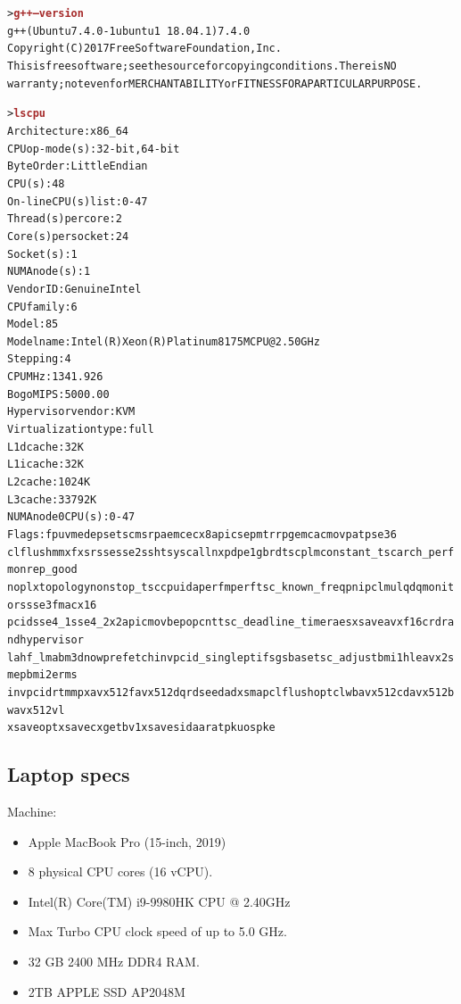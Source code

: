 \documentclass[10pt]{article}
\begin{document}
\begin{alltt}
\footnotesize
> \textbf{\textcolor{brown}{g++ --version}}
g++ (Ubuntu 7.4.0-1ubuntu1~18.04.1) 7.4.0
Copyright (C) 2017 Free Software Foundation, Inc.
This is free software; see the source for copying conditions.  There is NO
warranty; not even for MERCHANTABILITY or FITNESS FOR A PARTICULAR PURPOSE.


> \textbf{\textcolor{brown}{lscpu}}
Architecture:        x86_64
CPU op-mode(s):      32-bit, 64-bit
Byte Order:          Little Endian
CPU(s):              48
On-line CPU(s) list: 0-47
Thread(s) per core:  2
Core(s) per socket:  24
Socket(s):           1
NUMA node(s):        1
Vendor ID:           GenuineIntel
CPU family:          6
Model:               85
Model name:          Intel(R) Xeon(R) Platinum 8175M CPU @ 2.50GHz
Stepping:            4
CPU MHz:             1341.926
BogoMIPS:            5000.00
Hypervisor vendor:   KVM
Virtualization type: full
L1d cache:           32K
L1i cache:           32K
L2 cache:            1024K
L3 cache:            33792K
NUMA node0 CPU(s):   0-47
Flags:               fpu vme de pse tsc msr pae mce cx8 apic sep mtrr pge mca cmov pat pse36
clflush mmx fxsr sse sse2 ss ht syscall nx pdpe1gb rdtscp lm constant_tsc arch_perfmon rep_good
nopl xtopology nonstop_tsc cpuid aperfmperf tsc_known_freq pni pclmulqdq monitor ssse3 fma cx16
pcid sse4_1 sse4_2 x2apic movbe popcnt tsc_deadline_timer aes xsave avx f16c rdrand hypervisor
lahf_lm abm 3dnowprefetch invpcid_single pti fsgsbase tsc_adjust bmi1 hle avx2 smep bmi2 erms
invpcid rtm mpx avx512f avx512dq rdseed adx smap clflushopt clwb avx512cd avx512bw avx512vl
xsaveopt xsavec xgetbv1 xsaves ida arat pku ospke
\end{alltt}

\subsection{Laptop specs}


Machine:
\begin{itemize}
\item Apple MacBook Pro (15-inch, 2019)
\item 8 physical CPU cores (16 vCPU).
\item Intel(R) Core(TM) i9-9980HK CPU @ 2.40GHz
\item Max Turbo CPU clock speed of up to 5.0 GHz.
\item 32 GB 2400 MHz DDR4 RAM.
\item 2TB APPLE SSD AP2048M
\end{itemize}
\end{document}
